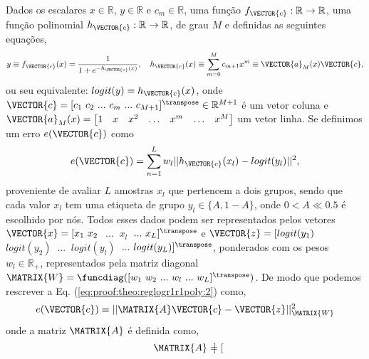 
\begin{myproofT}\label{proof:theo:reglogr1r1poly}
Dados 
os escalares $x \in \mathbb{R}$, $y \in \mathbb{R}$ e $c_m \in \mathbb{R}$,
uma função $f_{\VECTOR{c}}:\mathbb{R} \rightarrow \mathbb{R}$, 
uma função polinomial $h_{\VECTOR{c}}:\mathbb{R} \rightarrow \mathbb{R}$, de grau $M$ e 
definidas as seguintes equações,
\begin{equation}\label{eq:proof:theo:reglogr1r1poly:1}
y\equiv f_{\VECTOR{c}}(x)= \frac{1}{1+e^{-h_{\VECTOR{c}}(x) }},
\quad h_{\VECTOR{c}}(x)\equiv \sum_{m=0}^{M}c_{m+1} x^m\equiv \VECTOR{a}_M(x)\VECTOR{c},
\end{equation}
ou seu equivalente: $logit(y)=h_{\VECTOR{c}}(x)$,
onde $\VECTOR{c}=[c_1~ c_2~ ...~ c_m~ ...~ c_{M+1}]^{\transpose} \in \mathbb{R}^{M+1}$ é um vetor coluna e
$\VECTOR{a}_M(x)=\begin{bmatrix} 
1& x& x^2& \hdots & x^m& \hdots& x^M
\end{bmatrix}$ um vetor linha.
Se definimos um erro $e(\VECTOR{c})$ como
\begin{equation}\label{eq:proof:theo:reglogr1r1poly:2}
e(\VECTOR{c}) =  \sum_{n=1}^{L} w_l||h_{\VECTOR{c}}(x_l)-logit(y_l)||^2,
\end{equation}
proveniente de avaliar $L$ amostras $x_l$ que pertencem a dois grupos, 
sendo que cada valor $x_l$ tem uma etiqueta de grupo $y_l\in \{A,1-A\}$, 
onde $0<A\ll 0.5$ é escolhido por nós.
Todos esses dados podem ser representados pelos vetores 
$\VECTOR{x}=[x_1~ x_2~$ $...~$ $x_l~$ $...~ x_L]^{\transpose}$ 
e $\VECTOR{z}=[logit(y_1)~$ $logit(y_2)~$ $...~$ $logit(y_l)~$ $...~ logit(y_L)]^{\transpose}$,
ponderados com os pesos $w_l \in \mathbb{R}_+$, 
representados pela matriz diagonal $\MATRIX{W}=\funcdiag([w_1~ w_2~ ...~ w_l~ ...~ w_L]^{\transpose})$.
De modo que podemos rescrever a Eq. (\ref{eq:proof:theo:reglogr1r1poly:2}) como,
\begin{equation}\label{eq:proof:theo:reglogr1r1poly:3}
e(\VECTOR{c}) \equiv ||\MATRIX{A}\VECTOR{c}-\VECTOR{z}||_{\MATRIX{W}}^2 
\end{equation}
onde a matriz $\MATRIX{A}$ é definida como,
\begin{equation}\label{eq:proof:reglogr1r1poly:4}
\MATRIX{A}=\begin{bmatrix}

\end{bmatrix}
\end{equation}
\end{myproofT}
